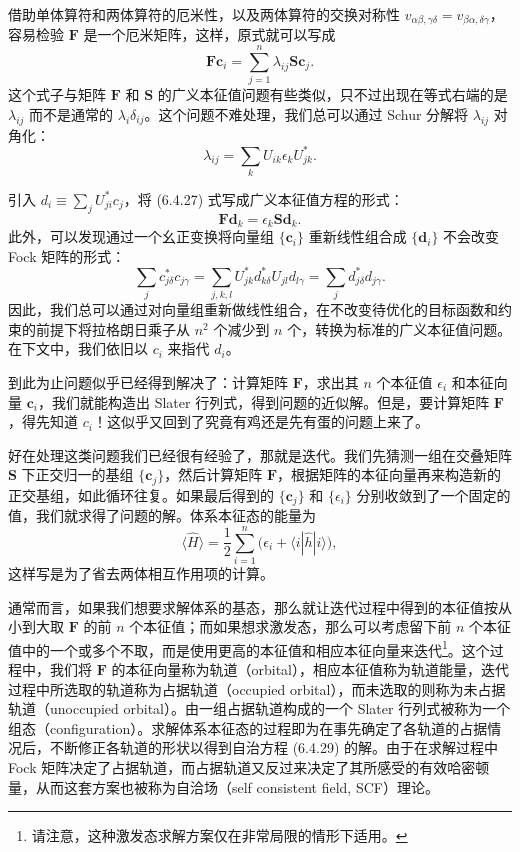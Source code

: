 借助单体算符和两体算符的厄米性，以及两体算符的交换对称性 $v_{\alpha\beta,\gamma\delta}=v_{\beta\alpha,\delta\gamma}$，容易检验 $\mathbf F$ 是一个厄米矩阵，这样，原式就可以写成
\begin{equation}
 \mathbf F\bm c_i=\sum_{j=1}^{n}\lambda_{ij}\mathbf S\bm c_j.
\tag{6.4.27}
\end{equation}
这个式子与矩阵 $\mathbf F$ 和 $\mathbf S$ 的广义本征值问题有些类似，只不过出现在等式右端的是 $\lambda_{ij}$ 而不是通常的 $\lambda_i\delta_{ij}$。这个问题不难处理，我们总可以通过 Schur 分解将 $\lambda_{ij}$ 对角化：
\begin{equation}
 \lambda_{ij}=\sum_k U_{ik}\epsilon_k U_{jk}^*.
\tag{6.4.28}
\end{equation}

引入 $d_i\equiv\sum_jU_{ji}^*c_j$，将 (6.4.27) 式写成广义本征值方程的形式：
\begin{equation}
 \mathbf F\bm d_k=\epsilon_k\mathbf S\bm d_k.
\tag{6.4.29}
\end{equation}
此外，可以发现通过一个幺正变换将向量组 $\{\bm c_i\}$ 重新线性组合成 $\{\bm d_i\}$ 不会改变 Fock 矩阵的形式：
\begin{equation}
 \sum_jc_{j\delta}^*c_{j\gamma}
 =\sum_{j,k,l}U_{jk}^*d_{k\delta}^*U_{jl}d_{l\gamma}
 =\sum_jd_{j\delta}^*d_{j\gamma}.
\tag{6.4.30}
\end{equation}
因此，我们总可以通过对向量组重新做线性组合，在不改变待优化的目标函数和约束的前提下将拉格朗日乘子从 $n^2$ 个减少到 $n$ 个，转换为标准的广义本征值问题。在下文中，我们依旧以 $c_i$ 来指代 $d_i$。

到此为止问题似乎已经得到解决了：计算矩阵 $\mathbf F$，求出其 $n$ 个本征值 $\epsilon_i$ 和本征向量 $\bm c_i$，我们就能构造出 Slater 行列式，得到问题的近似解。但是，要计算矩阵 $\mathbf F$，得先知道 $c_i$！这似乎又回到了究竟有鸡还是先有蛋的问题上来了。

好在处理这类问题我们已经很有经验了，那就是迭代。我们先猜测一组在交叠矩阵 $\mathbf S$ 下正交归一的基组 $\{\bm c_j\}$，然后计算矩阵 $\mathbf F$，根据矩阵的本征向量再来构造新的正交基组，如此循环往复。如果最后得到的 $\{\bm c_j\}$ 和 $\{\epsilon_i\}$ 分别收敛到了一个固定的值，我们就求得了问题的解。体系本征态的能量为
\begin{equation}
 \langle\hat H\rangle=\frac12\sum_{i=1}^{n}\bigl(\epsilon_i+\langle i|\hat h|i\rangle\bigr),
\tag{6.4.31}
\end{equation}
这样写是为了省去两体相互作用项的计算。

通常而言，如果我们想要求解体系的基态，那么就让迭代过程中得到的本征值按从小到大取 $\mathbf F$ 的前 $n$ 个本征值；而如果想求激发态，那么可以考虑留下前 $n$ 个本征值中的一个或多个不取，而是使用更高的本征值和相应本征向量来迭代\footnote{请注意，这种激发态求解方案仅在非常局限的情形下适用。}。这个过程中，我们将 $\mathbf F$ 的本征向量称为轨道（orbital），相应本征值称为轨道能量，迭代过程中所选取的轨道称为占据轨道（occupied orbital），而未选取的则称为未占据轨道（unoccupied orbital）。由一组占据轨道构成的一个 Slater 行列式被称为一个组态（configuration）。求解体系本征态的过程即为在事先确定了各轨道的占据情况后，不断修正各轨道的形状以得到自治方程 (6.4.29) 的解。由于在求解过程中 Fock 矩阵决定了占据轨道，而占据轨道又反过来决定了其所感受的有效哈密顿量，从而这套方案也被称为自洽场（self consistent field, SCF）理论。

